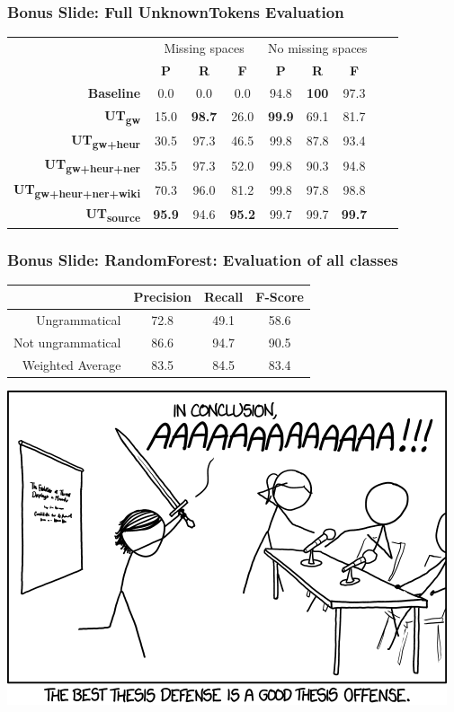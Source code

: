 \documentclass[table]{beamer}
\begin{document}
\begin{frame}
  \frametitle{Bonus Slide: Full \textbf{UnknownTokens} Evaluation}
  \begin{tabular}{r|c|c|c|c|c|c|c|c|}
  & \multicolumn{3}{c|}{Missing spaces} & \multicolumn{3}{c|}{No missing spaces}\\
  & \textbf{P} & \textbf{R} & \textbf{F} & \textbf{P} & \textbf{R} & \textbf{F}\\
  \hline
  \textbf{Baseline} & 0.0 & 0.0 & 0.0 & 94.8 & \textbf{100} & 97.3\\
  \hline\hline
  \textbf{UT\textsubscript{gw}} & 15.0 & \textbf{98.7} & 26.0 & \textbf{99.9} & 69.1 & 81.7\\
  \hline
  \textbf{UT\textsubscript{gw+heur}} & 30.5 & 97.3 & 46.5 & 99.8 & 87.8 & 93.4\\
  \hline
  \textbf{UT\textsubscript{gw+heur+ner}} & 35.5 & 97.3 & 52.0 & 99.8 & 90.3 & 94.8\\
  \hline
  \textbf{UT\textsubscript{gw+heur+ner+wiki}} & 70.3 & 96.0 & 81.2 & 99.8 & 97.8 & 98.8\\
  \hline\hline
  \textbf{UT\textsubscript{source}} & \textbf{95.9} & 94.6 & \textbf{95.2} & 99.7 & 99.7 & \textbf{99.7}\\
  \hline
  \end{tabular}
\end{frame}

\begin{frame}
  \frametitle{Bonus Slide: \textbf{RandomForest}: Evaluation of all classes}
  \quad\quad\begin{tabular}{r|c|c|c|}
  & \textbf{Precision} & \textbf{Recall} & \textbf{F-Score}\\
  \hline
  Ungrammatical & 72.8 & 49.1 & 58.6\\
  \hline\pause
  Not ungrammatical & 86.6 & 94.7 & 90.5\\
  \hline
  Weighted Average & 83.5 & 84.5 & 83.4\\
  \hline
  \end{tabular}
\end{frame}

\begin{frame}
  \quad\quad\includegraphics[scale=0.6]{thesis_defense.png}
\end{frame}
\end{document}
